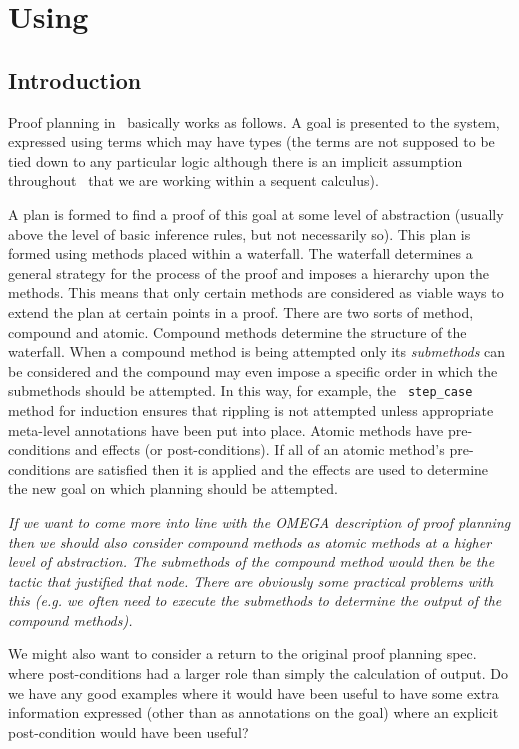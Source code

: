 \chapter{Using \lclam}
\label{basic}

\section{Introduction}
Proof planning in \lclam\ basically works as
follows.  A goal is presented to the system, expressed
using terms which may have types (the
terms are not supposed to be tied down to any particular logic
although there is an implicit assumption throughout \lclam\ that we
are working within a sequent calculus).

A plan is formed to find a proof of this goal at
some level of abstraction (usually above the level of basic inference
rules, but not necessarily so).  This plan is
formed using methods placed within a
waterfall.  The waterfall determines a general
strategy for the process of the proof and
imposes a hierarchy upon the methods.
This means that only certain methods are considered as viable ways to
extend the plan at certain points in a proof.  There are two sorts of
method, compound and
atomic.  Compound methods determine the structure
of the waterfall.  When a compound method is being attempted only its
{\em submethods} can be considered and the
compound may even impose a specific order in which the submethods
should be attempted.  In this way, for example, the {\tt
  step\_case} method for
induction ensures that
rippling is not attempted unless appropriate
meta-level annotations have been put into
place.  Atomic methods have pre-conditions and
effects (or post-conditions).  If all of an atomic
method's pre-conditions are satisfied then it is applied and the
effects are used to determine the new goal on which planning should be
attempted.

{\em If we want to come more into line with the OMEGA description of
  proof planning then we should also consider compound methods as
  atomic methods at a higher level of abstraction.  The submethods of
  the compound method would then be the tactic that justified that
  node.  There are obviously some
  practical problems with this (e.g. we often need to execute the
  submethods to determine the output of the compound methods).
  
  We might also want to consider a return to the original proof
  planning spec. where post-conditions had a larger role than simply
  the calculation of output.  Do we have any good examples where it
  would have been useful to have some extra information expressed
  (other than as annotations on the goal) where an explicit
  post-condition would have been useful?}

